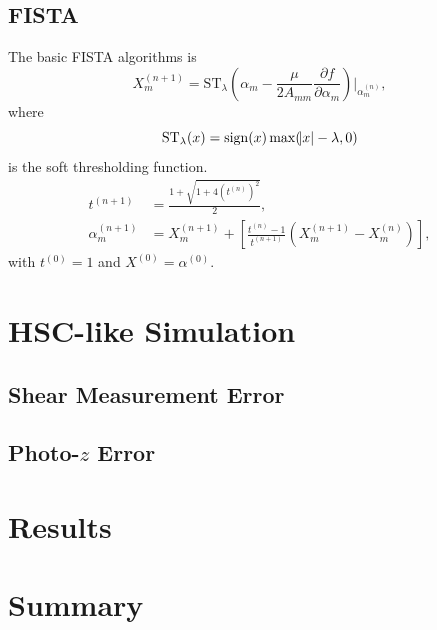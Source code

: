 \documentclass[twocolumn]{aastex62}
\begin{document}
\subsection{FISTA}
The basic FISTA algorithms is
\begin{equation}
X^{(n+1)}_m=\mathrm{ST}_{\lambda} (\alpha_m -\frac{\mu}{2A_{mm}} \frac{\partial f}{\partial \alpha_m})|_{\alpha^{(n)}_m} ,
\end{equation}
where
\begin{equation}
\mathrm{ST}_{\lambda} (x) = \mathrm{sign} (x) \max (\abs{x}-\lambda,0)
\end{equation}
is the soft thresholding function.
\begin{equation}
\begin{split}
t^{(n+1)} &= \frac{1+\sqrt{1+4(t^{(n)})^2}}{2},\\
\alpha^{(n+1)}_m&=X^{(n+1)}_m+[\frac{t^{(n)}-1}{t^{(n+1)}}(X^{(n+1)}_m-X^{(n)}_m)],
\end{split}
\end{equation}
with $t^{(0)}=1$ and $X^{(0)}=\alpha^{(0)}$.

\section{HSC-like Simulation}


\subsection{Shear Measurement Error}
\subsection{Photo-$z$ Error}




\section{Results}


\section{Summary}




\appendix
\end{document}
